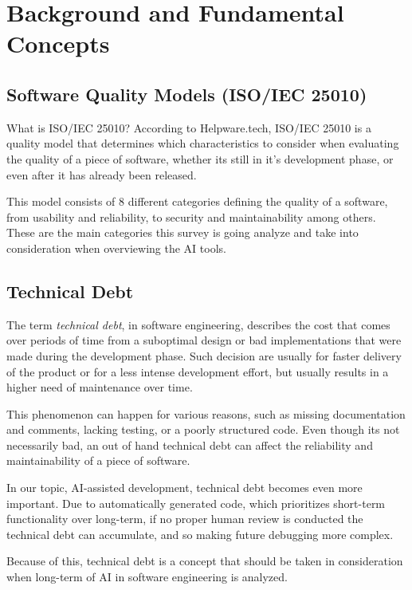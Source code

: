 \chapter{Background and Fundamental Concepts}


\section{Software Quality Models (ISO/IEC 25010)}

What is ISO/IEC 25010? According to Helpware.tech, ISO/IEC 25010 is a quality model that determines which characteristics to consider when evaluating the quality of a piece of software, whether its still in it's development phase, or even after it has already been released. 

This model consists of 8 different categories defining the quality of a software, from usability and reliability, to security and maintainability among others. These are the main categories this survey is going analyze and take into consideration when overviewing the AI tools.\cite{Quality}

\section{Technical Debt}

The term \textit{technical debt}, in software engineering, describes the cost that comes over periods of time from a suboptimal design or bad implementations that were made during the development phase. Such decision are usually for faster delivery of the product or for a less intense development effort, but usually results in a higher need of maintenance over time.

This phenomenon can happen for various reasons, such as missing documentation and comments, lacking testing, or a poorly structured code. Even though its not necessarily bad, an out of hand technical debt can affect the reliability and maintainability of a piece of software.

In our topic, AI-assisted development, technical debt becomes even more important. Due to automatically generated code, which prioritizes short-term functionality over long-term, if no proper human review is conducted the technical debt can accumulate, and so making future debugging more complex.

Because of this, technical debt is a concept that should be taken in consideration when long-term of AI in software engineering is analyzed.

